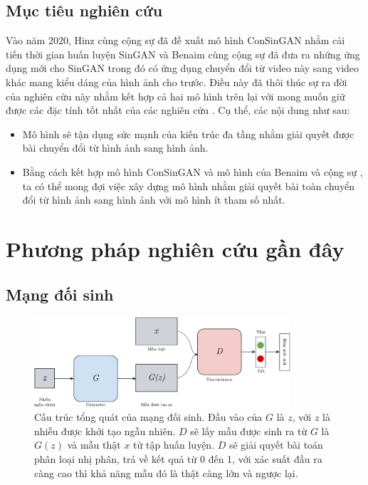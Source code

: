 \documentclass[12pt]{report}%
\begin{document}
\section{Mục tiêu nghiên cứu}
Vào năm 2020, Hinz cùng cộng sự \cite{hinz2020improved} đã đề xuất mô hình ConSinGAN nhằm cải tiến thời gian huấn luyện SinGAN và Benaim cùng cộng sự \cite{benaim2020structuralanalogy} đã đưa ra những ứng dụng mới cho SinGAN trong đó có ứng dụng chuyển đổi từ video này sang video khác mang kiểu dáng của hình ảnh cho trước. Điều này đã thôi thúc sự ra đời của nghiên cứu này nhằm kết hợp cả hai mô hình trên lại với mong muốn giữ được các đặc tính tốt nhất của các nghiên cứu \cite{benaim2020structuralanalogy, hinz2020improved}.  Cụ thể, các nội dung như sau:
\begin{itemize}
    \item Mô hình sẽ tận dụng sức mạnh của kiến trúc đa tầng  nhằm giải quyết được bài chuyển đổi từ hình ảnh sang hình ảnh.
    \item Bằng cách kết hợp mô hình ConSinGAN \cite{hinz2020improved} và mô hình của Benaim và cộng sự \cite{benaim2020structuralanalogy}, ta có thể mong đợi việc xây dựng mô hình nhằm giải quyết bài toàn chuyển đổi từ hình ảnh sang hình ảnh với mô hình ít tham số nhất.
\end{itemize}

\clearpage

\chapter{Phương pháp nghiên cứu gần đây}
\section{Mạng đối sinh}
\begin{figure}[t]
\vspace{-0.5cm}
	\centering
	\includegraphics[width=0.85\textwidth]{img/GAN-structure.pdf}
	\caption[Cấu trúc tổng quát của mạng đối sinh]{\blindtext Cấu trúc tổng quát của mạng đối sinh. \quad Đầu vào của $G$ là $z$, với $z$ là nhiễu được khởi tạo ngẫu nhiên. $D$ sẽ lấy mẫu được  sinh ra từ $G$ là $G(z)$ và mẫu thật $x$ từ tập huấn luyện. $D$ sẽ giải quyết bài toán phân loại nhị phân, trả về kết quả từ 0 đến 1, với xác suất đầu ra càng cao thì khả năng mẫu đó là thật càng lớn và ngược lại.}
	\label{fig:architecture} \vspace{-0.4cm}
\end{figure}
\end{document}
